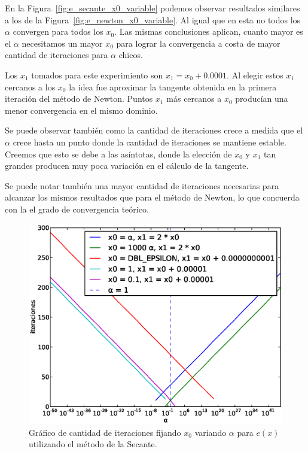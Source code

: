 En la Figura~\ref{fig:e_secante_x0_variable} podemos observar resultados
similares a los de la Figura~\ref{fig:e_newton_x0_variable}. Al igual que en
esta no todos los $\alpha$ convergen para todos los $x_0$. Las mismas
conclusiones aplican, cuanto mayor es el $\alpha$ necesitamos un mayor $x_0$
para lograr la convergencia a costa de mayor cantidad de iteraciones para
$\alpha$ chicos. 

Los $x_1$ tomados para este experimiento son $x_1 = x_0 + 0.0001$. Al elegir
estos $x_1$ cercanos a los $x_0$ la idea fue aproximar la tangente obtenida en
la primera iteración del método de Newton. Puntos $x_1$ más cercanos a $x_0$
producían una menor convergencia en el mismo dominio.

Se puede observar también como la cantidad de iteraciones crece a medida que el
$\alpha$ crece hasta un punto donde la cantidad de iteraciones se mantiene
estable. Creemos que esto se debe a las asíntotas, donde la elección de $x_0$ y
$x_1$ tan grandes producen muy poca variación en el cálculo de la tangente.

Se puede notar también una mayor cantidad de iteraciones necesarias para
alcanzar los mismos resultados que para el método de Newton, lo que concuerda
con la el grado de convergencia teórico.

\begin{figure}[!htbp]
  \begin{center}
    \includegraphics[scale=0.5]{graficos/new/e_secante_x0_fijo.eps}
    \caption{\label{fig:e_secante_x0_fijo} Gráfico de cantidad de iteraciones fijando $x_0$ variando $\alpha$ para $e(x)$ utilizando el método de la Secante.}
  \end{center}
\end{figure}

